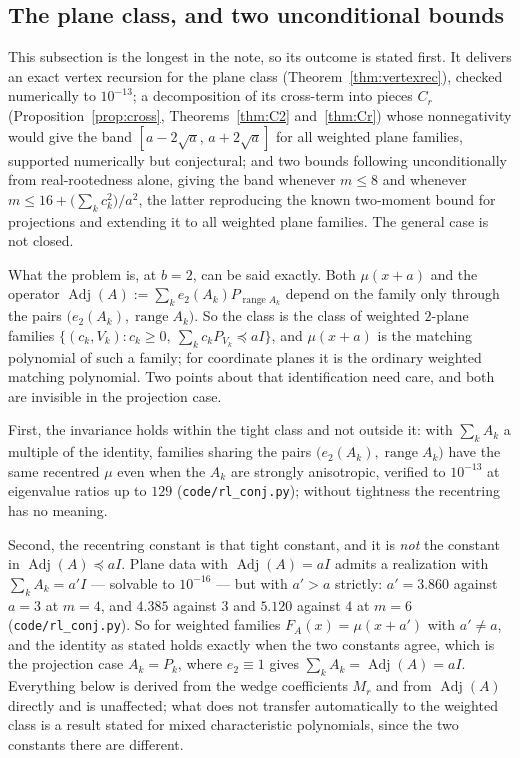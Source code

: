 \documentclass[11pt]{article}
\theoremstyle{remark}
\begin{document}
\subsection{The plane class, and two unconditional bounds}

This subsection is the longest in the note, so its outcome is stated first. It delivers an exact
vertex recursion for the plane class (Theorem~\ref{thm:vertexrec}), checked numerically to
$10^{-13}$; a decomposition of its cross-term into pieces $C_r$ (Proposition~\ref{prop:cross},
Theorems~\ref{thm:C2} and~\ref{thm:Cr}) whose nonnegativity would give the band
$[a-2\sqrt a,\,a+2\sqrt a]$ for all weighted plane families, supported numerically but
conjectural; and two bounds following unconditionally from real-rootedness alone, giving the band
whenever $m\le8$ and whenever $m\le16+\bigl(\sum_kc_k^2\bigr)/a^2$, the latter reproducing the
known two-moment bound for projections and extending it to all weighted plane families. The
general case is not closed.

What the problem is, at $b=2$, can be said exactly. Both $\mu(x+a)$ and the operator
$\operatorname{Adj}(A):=\sum_k e_2(A_k)P_{\operatorname{range}A_k}$ depend on the
family only through the pairs $\bigl(e_2(A_k),\operatorname{range}A_k\bigr)$. So the
class is the class of weighted $2$-plane families
$\{(c_k,V_k):c_k\ge0,\ \sum_kc_kP_{V_k}\preceq aI\}$, and $\mu(x+a)$ is the matching
polynomial of such a family; for coordinate planes it is the ordinary weighted
matching polynomial. Two points about that identification need care, and both are invisible in
the projection case.

First, the invariance holds within the tight class and not outside it: with $\sum_kA_k$ a
multiple of the identity, families sharing the pairs
$\bigl(e_2(A_k),\operatorname{range}A_k\bigr)$ have the same recentred $\mu$ even when the $A_k$
are strongly anisotropic, verified to $10^{-13}$ at eigenvalue ratios up to $129$
(\texttt{code/rl\_conj.py}); without tightness the recentring has no meaning.

Second, the recentring constant is that tight constant, and it is \emph{not} the constant in
$\operatorname{Adj}(A)\preceq aI$. Plane data with $\operatorname{Adj}(A)=aI$ admits a
realization with $\sum_kA_k=a'I$ --- solvable to $10^{-16}$ --- but with $a'>a$ strictly:
$a'=3.860$ against $a=3$ at $m=4$, and $4.385$ against $3$ and $5.120$ against $4$ at $m=6$
(\texttt{code/rl\_conj.py}). So for weighted families $F_A(x)=\mu(x+a')$ with $a'\ne a$, and the
identity as stated holds exactly when the two constants agree, which is the projection case
$A_k=P_k$, where $e_2\equiv1$ gives $\sum_kA_k=\operatorname{Adj}(A)=aI$. Everything below is
derived from the wedge coefficients $M_r$ and from $\operatorname{Adj}(A)$ directly and is
unaffected; what does not transfer automatically to the weighted class is a result stated for
mixed characteristic polynomials, since the two constants there are different.
\end{document}
